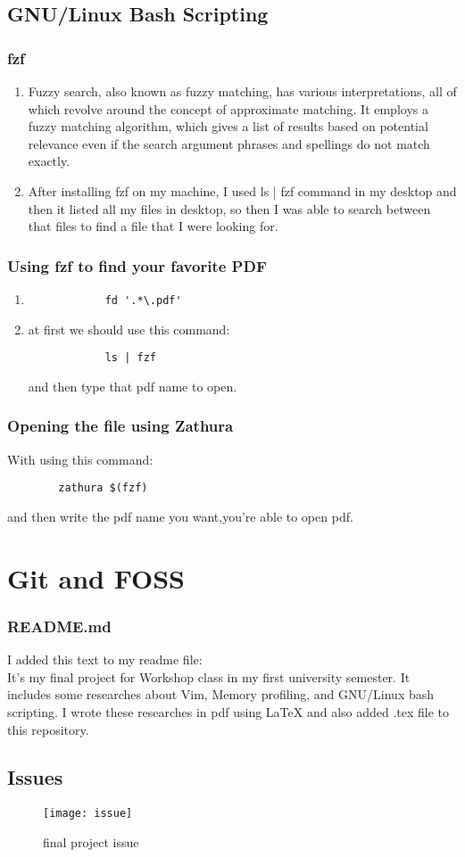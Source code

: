 \documentclass[titlepage]{article}
\begin{document}
	\subsection{GNU/Linux Bash Scripting}
	\subsubsection{fzf}
	\begin{enumerate}
		\item Fuzzy search, also known as fuzzy matching, has various interpretations, all of which revolve around the concept of approximate matching. It employs a fuzzy matching algorithm, which gives a list of results based on potential relevance even if the search argument phrases and spellings do not match exactly.
		\item After installing fzf on my machine, I used ls | fzf command in my desktop and then it listed all my files in desktop, so then I was able to search between that files to find a file that I were looking for.
	\end{enumerate}
	\subsubsection{ Using fzf to find your favorite PDF}
	\begin{enumerate}
		\item \begin{lstlisting}
			fd '.*\.pdf'
		\end{lstlisting}
		\item at first we should use this command:
		\begin{lstlisting}
			ls | fzf
		\end{lstlisting}
		and then type that pdf name to open.
	\end{enumerate}
	\subsubsection{Opening the file using Zathura}
	With using this command:
	\begin{lstlisting}
		zathura $(fzf)
	\end{lstlisting}
	and then write the pdf name you want,you're able to open pdf.
	\section{Git and FOSS}
	\subsubsection{README.md}
	I added this text to my readme file:\\It's my final project for Workshop class in my first university semester. It includes some researches about Vim, Memory profiling, and GNU/Linux bash scripting. I wrote these researches in pdf using LaTeX and also added .tex file to this repository.
	\subsection{Issues}
\begin{figure}[h]
	\centering
	\texttt{[image: issue]}
	\caption{final project issue}
\end{figure}
	
	
\end{document}
